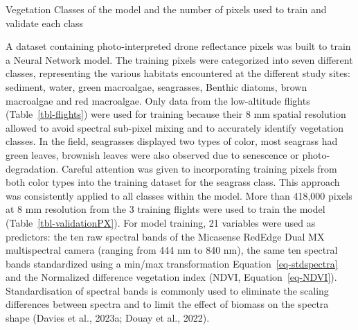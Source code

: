\documentclass[
  letterpaper,
  11pt,
  english,
  singlespacing,
  headsepline]{MastersDoctoralThesis}
\begin{document}
\begin{spacing}{1.5}
\begin{table}

\caption{\label{tbl-validationPX}Vegetation Classes of the model and the
number of pixels used to train and validate each class}


\end{table}%

A dataset containing photo-interpreted drone reflectance pixels was
built to train a Neural Network model. The training pixels were
categorized into seven different classes, representing the various
habitats encountered at the different study sites: sediment, water,
green macroalgae, seagrasses, Benthic diatoms, brown macroalgae and red
macroalgae. Only data from the low-altitude flights
(Table~\ref{tbl-flights}) were used for training because their 8 mm
spatial resolution allowed to avoid spectral sub-pixel mixing and to
accurately identify vegetation classes. In the field, seagrasses
displayed two types of color, most seagrass had green leaves, brownish
leaves were also observed due to senescence or photo-degradation.
Careful attention was given to incorporating training pixels from both
color types into the training dataset for the seagrass class. This
approach was consistently applied to all classes within the model. More
than 418,000 pixels at 8 mm resolution from the 3 training flights were
used to train the model (Table~\ref{tbl-validationPX}). For model
training, 21 variables were used as predictors: the ten raw spectral
bands of the Micasense RedEdge Dual MX multispectral camera (ranging
from 444 nm to 840 nm), the same ten spectral bands standardized using a
min/max transformation Equation~\ref{eq-stdspectra} and the Normalized
difference vegetation index (NDVI, Equation~\ref{eq-NDVI}).
Standardisation of spectral bands is commonly used to eliminate the
scaling differences between spectra and to limit the effect of biomass
on the spectra shape (Davies et al., 2023a; Douay et al., 2022).


\end{spacing}
\end{document}
